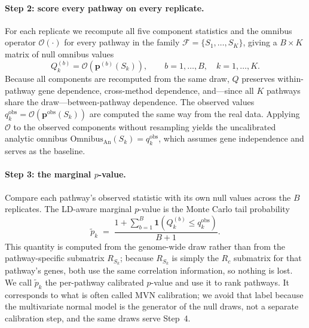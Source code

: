 \paragraph{Step 2: score every pathway on every replicate.}
For each replicate we recompute all five component statistics and the omnibus operator $\mathcal{O}(\cdot)$ for every pathway in the family $\mathcal{F}=\{S_1,\dots,S_K\}$, giving a $B\times K$ matrix of null omnibus values
\[
Q^{(b)}_k = \mathcal{O}\!\left(\mathbf{p}^{(b)}(S_k)\right),
\qquad b=1,\dots,B,\quad k=1,\dots,K .
\]
Because all components are recomputed from the same draw, $Q$ preserves within-pathway gene dependence, cross-method dependence, and—since all $K$ pathways share the draw—between-pathway dependence. The observed values $q^{\mathrm{obs}}_k=\mathcal{O}(\mathbf{p}^{\mathrm{obs}}(S_k))$ are computed the same way from the real data. Applying $\mathcal{O}$ to the observed components without resampling yields the uncalibrated analytic omnibus $\mathrm{Omnibus}_{\mathrm{An}}(S_k)=q^{\mathrm{obs}}_k$, which assumes gene independence and serves as the baseline.

\paragraph{Step 3: the marginal \texorpdfstring{$p$}{p}-value.}
Compare each pathway's observed statistic with its own null values across the $B$ replicates. The LD-aware marginal $p$-value is the Monte Carlo tail probability
\[
\tilde p_k \;=\;
\frac{1+\sum_{b=1}^{B}\mathbf{1}\!\left(Q^{(b)}_k\le q^{\mathrm{obs}}_k\right)}{B+1}.
\]
This quantity is computed from the genome-wide draw rather than from the pathway-specific submatrix $R_{S_k}$; because $R_{S_k}$ is simply the $R_c$ submatrix for that pathway's genes, both use the same correlation information, so nothing is lost. We call $\tilde p_k$ the per-pathway calibrated $p$-value and use it to rank pathways. It corresponds to what is often called MVN calibration; we avoid that label because the multivariate normal model is the generator of the null draws, not a separate calibration step, and the same draws serve Step~4.

